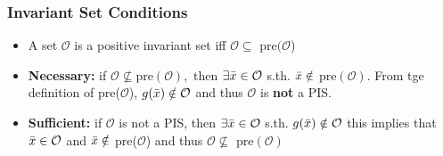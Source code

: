 \subsubsection{Invariant Set Conditions}
\begin{itemize}
    \item A set $\mathcal{O}$ is a positive invariant set iff $\mathcal{O} \subseteq$ pre$(\mathcal{O}$)
    \item\textbf{Necessary:} if $\mathcal{O} \nsubseteq \textrm{pre}(\mathcal{O}),$ then $\exists \Bar{x} \in \mathcal{O}$ s.th. $\Bar{x} \notin$ pre$(\mathcal{O})$. From tge definition of pre($\mathcal{O}$), $g(\Bar{x}) \notin \mathcal{O}$ and thus $\mathcal{O}$ is \textbf{not} a PIS.
    \item\textbf{Sufficient:} if $\mathcal{O}$ is not a PIS, then $\exists \Bar{x} \in \mathcal{O}$ s.th. $g(\Bar{x}) \notin\mathcal{O}$ this implies that $\Bar{x} \in \mathcal{O}$ and $\Bar{x} \notin$ pre($\mathcal{O}$) and thus $\mathcal{O} \nsubseteq$ pre$(\mathcal{O})$
\end{itemize}